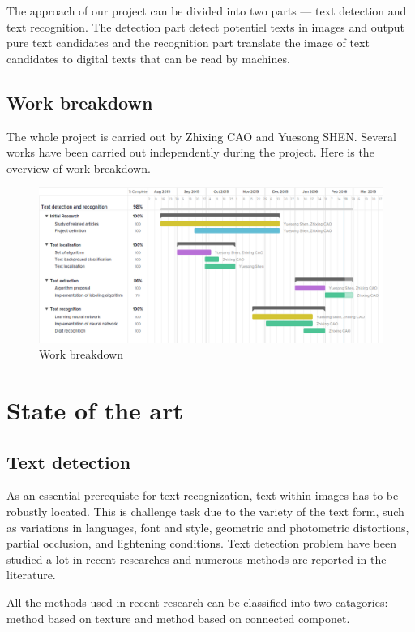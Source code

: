 \documentclass[paper=a4, french, 11pt]{scrartcl}
\begin{document}
The approach of our project can be divided into two parts --- text detection and text recognition. The detection part detect potentiel texts in images and output pure text candidates and the recognition part translate the image of text candidates to digital texts that can be read by machines.

\subsection{Work breakdown}
The whole project is carried out by Zhixing CAO and Yuesong SHEN. Several works have been carried out independently during the project. Here is the overview of work breakdown.

\begin{figure}[h]
\begin{center}
   \includegraphics[width=0.9\linewidth]{breakdowns.png}
\end{center}
\vspace{-4ex}
\caption{Work breakdown}
\label{fig:heatmap}
\end{figure}
 
\section{State of the art}
\subsection{Text detection}
As an essential prerequiste for text recognization, text within images has to be robustly located. This is challenge task due to the variety of the text form, such as variations in languages, font and style, geometric and photometric distortions, partial occlusion, and lightening conditions. Text detection problem have been studied a lot in recent researches and numerous methods are reported in the literature.

All the methods used in recent research can be classified into two catagories: method based on texture and method based on connected componet.
\end{document}
